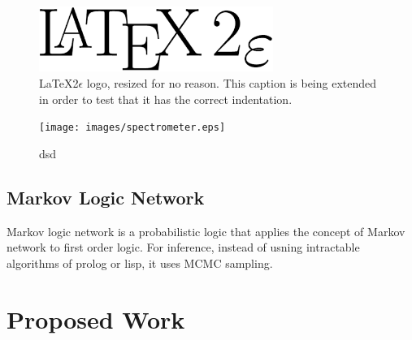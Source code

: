 \begin{figure}[htbp]
  \centering
    \includegraphics[width=3in, scale=0.5]{images/LaTeX2e_logo.eps}
    \caption[\LaTeX 2\ensuremath{\epsilon} logo(resized for no reason)]{\LaTeX 2\ensuremath{\epsilon} logo, resized for no reason. This caption is being extended in order to test that it has the correct indentation.}
\end{figure}

\begin{figure}[htbp]
  \centering
    \texttt{[image: images/spectrometer.eps]}
    \caption[Hey]{dsd}
\end{figure}

%

\subsection{Markov Logic Network}
Markov logic network is a probabilistic logic that applies the concept of Markov network to first order logic. For inference, instead of usning intractable algorithms of prolog or lisp, it uses MCMC sampling.

\section{Proposed Work}

